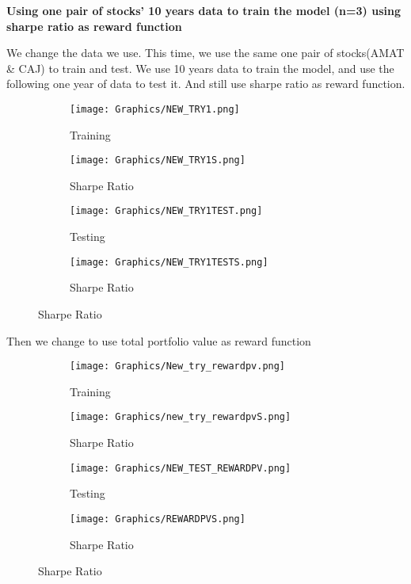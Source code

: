 \newpage
\textbf{Using one pair of stocks’ 10 years data to train the model (n=3) using sharpe ratio as reward function}

We change the data we use. This time, we use the same one pair of stocks(AMAT \& CAJ) to train and test. We use 10 years data to train the model, and use the following one year of data to test it. And still use sharpe ratio as reward function.

\begin{figure}[H]
\begin{subfigure}{.5\textwidth}%
\centering
\texttt{[image: Graphics/NEW\_TRY1.png]} \caption{Training} 
\end{subfigure}%
\begin{subfigure}{.5\textwidth}%
\centering
\texttt{[image: Graphics/NEW\_TRY1S.png]} \caption{Sharpe Ratio}
\end{subfigure}%
\vspace{0.4cm}
\begin{subfigure}{.5\textwidth}%
\centering
\texttt{[image: Graphics/NEW\_TRY1TEST.png]} \caption{Testing} 
\end{subfigure}%
\begin{subfigure}{.5\textwidth}%
\centering
\texttt{[image: Graphics/NEW\_TRY1TESTS.png]} \caption{Sharpe Ratio}
\end{subfigure}%
\end{figure}

\newpage
Then we change to use total portfolio value as reward function
\begin{figure}[H]
\begin{subfigure}{.5\textwidth}%
\centering
\texttt{[image: Graphics/New\_try\_rewardpv.png]} \caption{Training} 
\end{subfigure}%
\begin{subfigure}{.5\textwidth}%
\centering
\texttt{[image: Graphics/new\_try\_rewardpvS.png]} \caption{Sharpe Ratio}
\end{subfigure}%
\vspace{0.4cm}
\begin{subfigure}{.5\textwidth}%
\centering
\texttt{[image: Graphics/NEW\_TEST\_REWARDPV.png]} \caption{Testing} 
\end{subfigure}%
\begin{subfigure}{.5\textwidth}%
\centering
\texttt{[image: Graphics/REWARDPVS.png]} \caption{Sharpe Ratio}
\end{subfigure}%
\end{figure}

